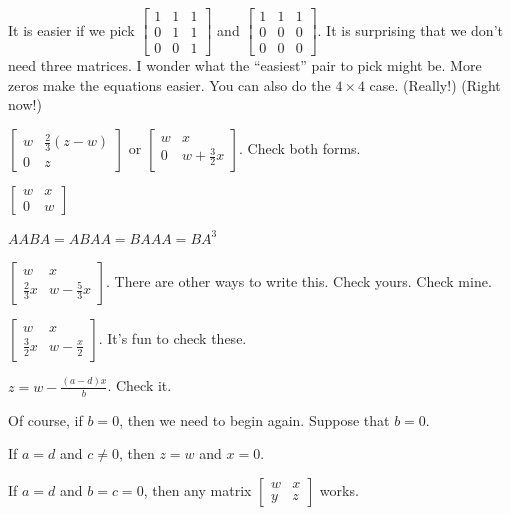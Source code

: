 \documentclass{article}
\begin{document}
\begin{description}
    It is easier if we pick $\begin{bmatrix} 1 & 1 & 1 \\ 0 & 1 & 1 \\ 0 & 0 & 1 \end{bmatrix}$ and $\begin{bmatrix} 1 & 1 & 1 \\ 0 & 0 & 0 \\ 0 & 0 & 0 \end{bmatrix}$. It is surprising that we don't need three matrices. I wonder what the ``easiest'' pair to pick might be. More zeros make the equations easier. You can also do the $4 \times 4$ case. (Really!) (Right now!)

  \item[89.] $\begin{bmatrix} w & \frac{2}{3}(z-w) \\ 0 & z \end{bmatrix}$ or $\begin{bmatrix} w & x \\ 0 & w+\frac{3}{2}x \end{bmatrix}$. Check both forms.

  \item[90.] $\begin{bmatrix} w & x \\ 0 & w \end{bmatrix}$

  \item[91.] $AABA = ABAA = BAAA = BA^3$

  \item[92.] $\begin{bmatrix} w & x \\ \frac{2}{3}x & w-\frac{5}{3}x \end{bmatrix}$. There are other ways to write this. Check yours. Check mine.

  \item[93.] $\begin{bmatrix} w & x \\ \frac{3}{2}x & w-\frac{x}{2} \end{bmatrix}$. It's fun to check these.

  \item[94.] $z = w-\frac{(a-d)x}{b}$.  Check it.

    Of course, if $b=0$, then we need to begin again. Suppose that $b=0$.

    If $a=d$ and $c \neq 0$, then $z=w$ and $x=0$.

    If $a=d$ and $b=c=0$, then any matrix $\begin{bmatrix} w & x \\ y & z \end{bmatrix}$ works.


\end{description}
\end{document}
